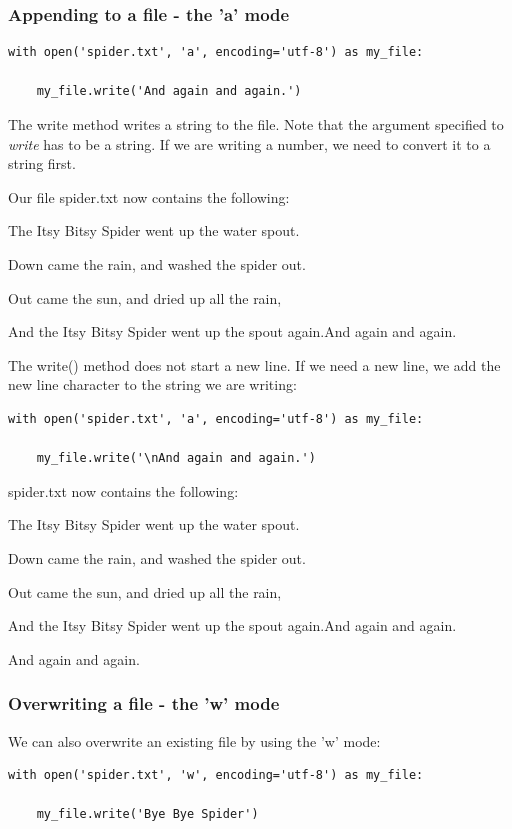\documentclass{article}
\begin{document}
\subsubsection{Appending to a file - the 'a' mode}

\begin{lstlisting}
with open('spider.txt', 'a', encoding='utf-8') as my_file:

    my_file.write('And again and again.')
\end{lstlisting}

The write method writes a string to the file.  Note that the argument specified to \textit{write} has to be a string.  If we are writing a number, we need to convert it to a string first.

Our file spider.txt now contains the following:

The Itsy Bitsy Spider went up the water spout.

Down came the rain, and washed the spider out.

Out came the sun, and dried up all the rain,

And the Itsy Bitsy Spider went up the spout again.And again and again.

The write() method does not start a new line.  If we need a new line, we add the new line character to the string we are writing:

\begin{lstlisting}
with open('spider.txt', 'a', encoding='utf-8') as my_file:

    my_file.write('\nAnd again and again.')
\end{lstlisting}

spider.txt now contains the following:

The Itsy Bitsy Spider went up the water spout.

Down came the rain, and washed the spider out.

Out came the sun, and dried up all the rain,

And the Itsy Bitsy Spider went up the spout again.And again and again.

And again and again.

\subsubsection{Overwriting a file - the 'w' mode}

We can also overwrite an existing file by using the 'w' mode:

\begin{lstlisting}
with open('spider.txt', 'w', encoding='utf-8') as my_file:

    my_file.write('Bye Bye Spider')
\end{lstlisting}
\end{document}
